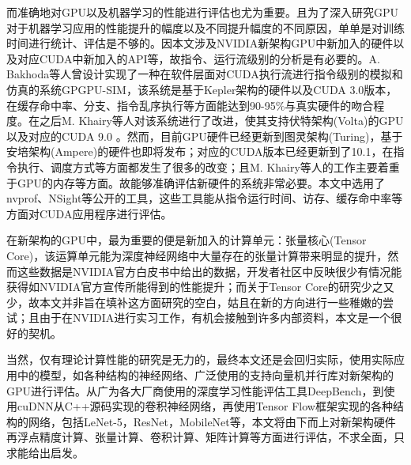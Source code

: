 \par 而准确地对GPU以及机器学习的性能进行评估也尤为重要。且为了深入研究GPU对于机器学习应用的性能提升的幅度以及不同提升幅度的不同原因，单单是对训练时间进行统计、评估是不够的。因本文涉及NVIDIA新架构GPU中新加入的硬件以及对应CUDA中新加入的API等，故指令、运行流级别的分析是有必要的。A. Bakhoda等人曾设计实现了一种在软件层面对CUDA执行流进行指令级别的模拟和仿真的系统GPGPU-SIM，该系统是基于Kepler架构的硬件以及CUDA 3.0版本，在缓存命中率、分支、指令乱序执行等方面能达到90-95\%与真实硬件的吻合程度\cite{GPGPUSIM}。在之后M. Khairy等人对该系统进行了改进，使其支持伏特架构(Volta)的GPU以及对应的CUDA 9.0 \cite{GPGPUSIM2}。然而，目前GPU硬件已经更新到图灵架构(Turing)，基于安培架构(Ampere)的硬件也即将发布；对应的CUDA版本已经更新到了10.1，在指令执行、调度方式等方面都发生了很多的改变；且M. Khairy等人的工作主要着重于GPU的内存等方面。故能够准确评估新硬件的系统非常必要。本文中选用了nvprof、NSight等公开的工具，这些工具能从指令运行时间、访存、缓存命中率等方面对CUDA应用程序进行评估\cite{NSIGHT}。
\par 在新架构的GPU中，最为重要的便是新加入的计算单元：张量核心(Tensor Core)，该运算单元能为深度神经网络中大量存在的张量计算带来明显的提升\cite{VOLTAWHITEPAPER}，然而这些数据是NVIDIA官方白皮书中给出的数据，开发者社区中反映很少有情况能获得如NVIDIA官方宣传所能得到的性能提升；而关于Tensor Core的研究少之又少，故本文并非旨在填补这方面研究的空白，姑且在新的方向进行一些稚嫩的尝试；且由于在NVIDIA进行实习工作，有机会接触到许多内部资料，本文是一个很好的契机。
\par 当然，仅有理论计算性能的研究是无力的，最终本文还是会回归实际，使用实际应用中的模型，如各种结构的神经网络、广泛使用的支持向量机并行库对新架构的GPU进行评估。从广为各大厂商使用的深度学习性能评估工具DeepBench\cite{DEEPBENCH}，到使用cuDNN从C++源码实现的卷积神经网络，再使用Tensor Flow框架实现的各种结构的网络，包括LeNet-5\cite{LENET}，ResNet\cite{RESNET}，MobileNet\cite{MOBILE}等，本文将由下而上对新架构硬件再浮点精度计算、张量计算、卷积计算、矩阵计算等方面进行评估，不求全面，只求能给出启发。

